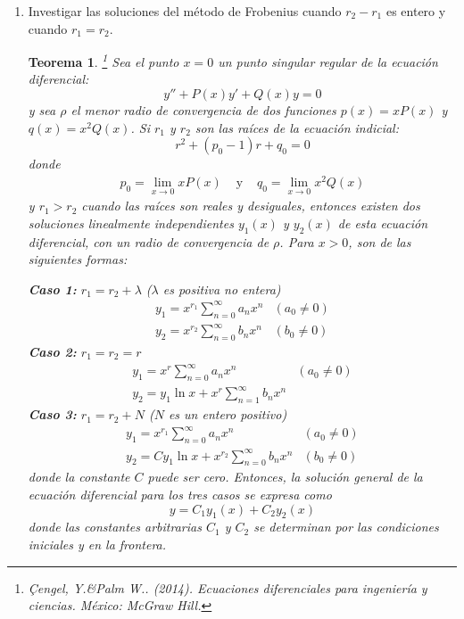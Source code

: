 \documentclass{article}
\newtheorem{teo}{Teorema}
\begin{document}
\begin{enumerate}
        \item {
            Investigar las soluciones del método de Frobenius cuando $r_2 - r_1$
            es entero y cuando $r_1 = r_2$.

            \color{azul}
            \begin{teo}
                \footnote{\c{C}engel, Y.\&Palm W.. (2014). Ecuaciones diferenciales para ingeniería y ciencias. México:
                McGraw Hill.}
                Sea el punto $x=0$ un punto singular regular de la ecuación diferencial:
                $$y''+P(x)y'+Q(x)y=0$$
                y sea $\rho$ el menor radio de convergencia de dos funciones $p(x)=xP(x)$ y $q(x)=x^2Q(x)$. Si $r_1$ y
                $r_2$ son las raíces de la ecuación indicial:
                $$r^2+(p_0-1)r+q_0=0$$
                donde
                \begin{eqnarray*}
                    p_0=\lim_{x\to 0}xP(x) & \text{ y } & q_0=\lim_{x\to 0}x^2Q(x)
                \end{eqnarray*}
                y $r_1>r_2$ cuando las raíces son reales y desiguales, entonces existen dos soluciones linealmente
                independientes $y_1(x)$ y $y_2(x)$ de esta ecuación diferencial, con un radio de convergencia de
                $\rho$. Para $x>0$, son de las siguientes formas:

                {\bf Caso 1:} $r_1=r_2+\lambda$ ($\lambda$ es positiva no entera)
                \begin{eqnarray*}
                    y_1=x^{r_1}\sum_{n=0}^{\infty}{a_nx^n} & (a_0\neq 0) \\
                    y_2=x^{r_2}\sum_{n=0}^{\infty}{b_nx^n} & (b_0\neq 0) 
                \end{eqnarray*}
                {\bf Caso 2:} $r_1=r_2=r$
                \begin{eqnarray*}
                    y_1=x^{r}\sum_{n=0}^{\infty}{a_nx^n} & (a_0\neq 0) \\
                    y_2=y_1\ln{x}+x^{r}\sum_{n=1}^{\infty}{b_nx^n}
                \end{eqnarray*}
                {\bf Caso 3:} $r_1=r_2+N$ ($N$ es un entero positivo)
                \begin{eqnarray*}
                    y_1=x^{r_1}\sum_{n=0}^{\infty}{a_nx^n} & (a_0\neq 0) \\
                    y_2=Cy_1\ln{x}+x^{r_2}\sum_{n=0}^{\infty}{b_nx^n} & (b_0\neq 0)
                \end{eqnarray*}
                donde la constante $C$ puede ser cero. Entonces, la solución general de la ecuación diferencial para
                los tres casos se expresa como
                $$y=C_1y_1(x)+C_2y_2(x)$$
                donde las constantes arbitrarias $C_1$ y $C_2$ se determinan por las condiciones iniciales y en la
                frontera.
            \end{teo}
        }


\end{enumerate}
\end{document}
